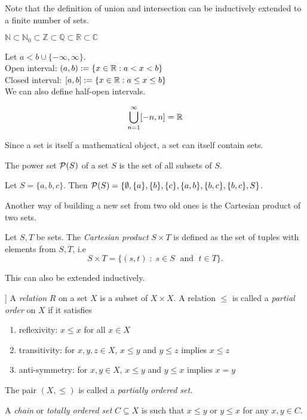 \documentclass{article}
\begin{document}
Note that the definition of union and intersection can be inductively extended to a finite number of sets.

\begin{example}
$\mathbb{N} \subset \mathbb{N}_0 \subset \mathbb{Z} \subset \mathbb{Q} \subset \mathbb{R} \subset \mathbb{C}$
\end{example}

\begin{example} Let $a < b \cup \{-\infty, \infty \}$. \\
Open interval: $(a,b) := \{x \in {\mathbb{R}} : a < x < b \}$ \\
Closed interval: $[a,b] := \{x \in {\mathbb{R}} : a \leq x \leq b \}$ \\
We can also define half-open intervals. 
\end{example}

\begin{example}
$$\bigcup_{n=1}^\infty [-n,n] = {\mathbb{R}}$$
\end{example}

Since a set is itself a mathematical object, a set can itself contain sets.
\begin{definition}
The power set $\mathcal{P}(S)$ of a set $S$ is the set of all subsets of $S$.
\end{definition}

\begin{example}
Let $S = \{a,b,c\}$. Then $\mathcal{P}(S) = \{ \emptyset, \{a\}, \{b\}, \{c\}, \{a,b\},\{b,c\}, \{b,c\}, S \}$. 
\end{example}

Another way of building a new set from two old ones is the Cartesian product of two sets.

\begin{definition}\label{def:cartes_prod}
Let $S,T$ be sets. The \emph{Cartesian product} $S\times T$ is defined as the set of tuples with elements from $S,T$, i.e 
\begin{equation*}
    S\times T = \{ (s,t) \; \colon \; s \in S \; \text{ and } \; t \in T\}.
\end{equation*}
\end{definition}

This can also be extended inductively. 

\begin{definition}[\cite{marcoux2019}[Definition 2.4] ]
A \emph{relation} $R$ on a set $X$ is a subset of $X \times X$. A relation $\leq$ is called a \emph{partial order} on $X$ if it satisfies
\begin{enumerate}
\item reflexivity: $x \leq x$ for all $x \in X$
\item transitivity: for $x,y,z \in X$, $x \leq y$ and $y \leq z$ implies $x \leq z$
\item anti-symmetry: for $x,y \in X$, $x \leq y$ and $y \leq x$ implies $x = y$
\end{enumerate}
The pair $(X, \leq)$ is called a \emph{partially ordered set}.

A \emph{chain} or \emph{totally ordered set} $C \subseteq X$ is such that $x \leq y$ or $y \leq x$ for any $x,y \in C$.
\end{definition}
\end{document}
